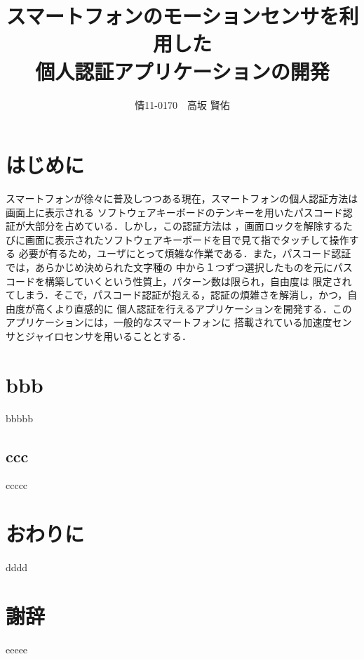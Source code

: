 \documentclass[11pt]{jreport}
\title{\bfseries スマートフォンのモーションセンサを利用した\\個人認証アプリケーションの開発}
\author{情11-0170　高坂 賢佑}
\date{}
\begin{document}
\maketitle

\tableofcontents
\listoffigures

\chapter*{はじめに}
スマートフォンが徐々に普及しつつある現在，スマートフォンの個人認証方法は画面上に表示される
ソフトウェアキーボードのテンキーを用いたパスコード認証が大部分を占めている．しかし，この認証方法は
，画面ロックを解除するたびに画面に表示されたソフトウェアキーボードを目で見て指でタッチして操作する
必要が有るため，ユーザにとって煩雑な作業である．また，パスコード認証では，あらかじめ決められた文字種の
中から１つずつ選択したものを元にパスコードを構築していくという性質上，パターン数は限られ，自由度は
限定されてしまう．そこで，パスコード認証が抱える，認証の煩雑さを解消し，かつ，自由度が高くより直感的に
個人認証を行えるアプリケーションを開発する．このアプリケーションには，一般的なスマートフォンに
搭載されている加速度センサとジャイロセンサを用いることとする．

\chapter{bbb}
bbbbb

\section{ccc}
ccccc

\chapter{おわりに}
dddd

\chapter*{謝辞}
eeeee
\end{document}
